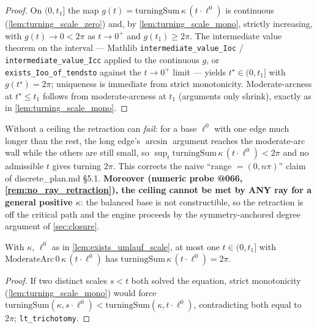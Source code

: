 \begin{proof}
  \leanok
  On $(0, t_1]$ the map $g(t) = \mathrm{turningSum}\,\kappa\,(t\cdot\ell^0)$ is
  continuous (\cref{lem:turning_scale_zero}) and, by
  \cref{lem:turning_scale_mono}, strictly increasing, with
  $g(t) \to 0 < 2\pi$ as $t \to 0^+$ and $g(t_1) \ge 2\pi$. The intermediate
  value theorem on the interval — Mathlib
  \texttt{intermediate\_value\_Ioc} / \texttt{intermediate\_value\_Icc} applied
  to the continuous $g$, or \texttt{exists\_Ioo\_of\_tendsto} against the
  $t\to0^+$ limit — yields $t^\star \in (0, t_1]$ with $g(t^\star) = 2\pi$;
  uniqueness is immediate from strict monotonicity. Moderate-arcness at
  $t^\star \le t_1$ follows from moderate-arcness at $t_1$ (arguments only
  shrink), exactly as in \cref{lem:turning_scale_mono}.
\end{proof}

\begin{remark}
  Without a ceiling the retraction can \emph{fail}: for a base $\ell^0$ with one
  edge much longer than the rest, the long edge's $\arcsin$ argument reaches the
  moderate-arc wall while the others are still small, so
  $\sup_t \mathrm{turningSum}\,\kappa\,(t\cdot\ell^0) < 2\pi$ and no admissible
  $t$ gives turning $2\pi$. This corrects the naive ``range $= (0, n\pi)$'' claim
  of discrete\_plan.md §5.1. \textbf{Moreover (numeric probe @066,
  \cref{rem:no_ray_retraction}), the ceiling cannot be met by ANY ray for a
  general positive $\kappa$}: the balanced base is not constructible, so the
  retraction is off the critical path and the engine proceeds by the
  symmetry-anchored degree argument of \cref{sec:closure}.
\end{remark}

\begin{lemma}
  \label{lem:umlauf_scale_unique}
  \leanok
  With $\kappa$, $\ell^0$ as in \cref{lem:exists_umlauf_scale}, at most one
  $t \in (0, t_1]$ with $\mathrm{ModerateArc}\,0\,\kappa\,(t\cdot\ell^0)$ has
  $\mathrm{turningSum}\,\kappa\,(t\cdot\ell^0) = 2\pi$.
\end{lemma}

\begin{proof}
  \leanok
  If two distinct scales $s < t$ both solved the equation, strict monotonicity
  (\cref{lem:turning_scale_mono}) would force
  $\mathrm{turningSum}(\kappa,s\cdot\ell^0) < \mathrm{turningSum}(\kappa,t\cdot\ell^0)$,
  contradicting both equal to $2\pi$; \texttt{lt\_trichotomy}.
\end{proof}

